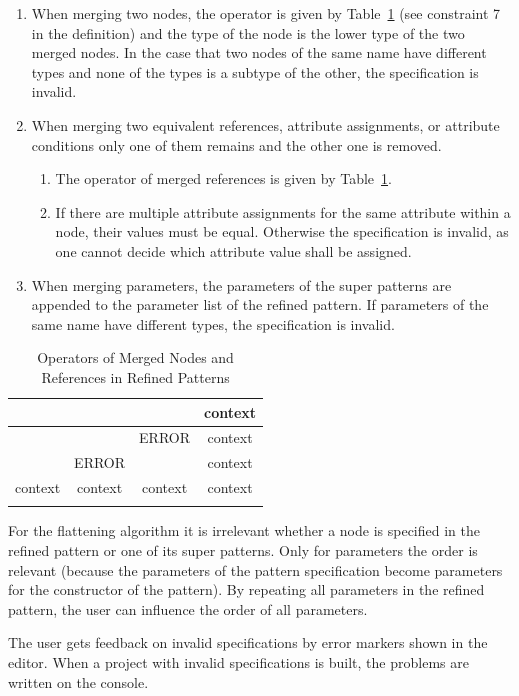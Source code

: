 \begin{enumerate}
	\item When merging two nodes, the operator is given by Table~\ref{table:merging-operators} (see constraint 7 in the definition) and the type of the node is the lower type of the two merged nodes.
		In the case that two nodes of the same name have different types and none of the types is a subtype of the other, the specification is invalid.
	\item When merging two equivalent references, attribute assignments, or attribute conditions only one of them remains and the other one is removed.
		\begin{enumerate}
			\item The operator of merged references is given by Table~\ref{table:merging-operators}.
			\item If there are multiple attribute assignments for the same attribute within a node, their values must be equal.
				Otherwise the specification is invalid, as one cannot decide which attribute value shall be assigned.
		\end{enumerate}
	\item When merging parameters, the parameters of the super patterns are appended to the parameter list of the refined pattern.
		If parameters of the same name have different types, the specification is invalid.
\end{enumerate}

\begin{longtable}[h!]{c|ccc}
	\toprule
				& \create	& \delete 	& context \\
	\midrule
	\create		& \create	& ERROR		& context \\
	\delete		& ERROR		& \delete	& context \\
	context		& context	& context	& context \\
	\bottomrule
	\caption{Operators of Merged Nodes and References in Refined Patterns}
	\label{table:merging-operators}
\end{longtable}

\noindent
For the flattening algorithm it is irrelevant whether a node is specified in the refined pattern or one of its super patterns.
Only for parameters the order is relevant (because the parameters of the pattern specification become parameters for the constructor of the pattern).
By repeating all parameters in the refined pattern, the user can influence the order of all parameters.

The user gets feedback on invalid specifications by error markers shown in the editor.
When a project with invalid specifications is built, the problems are written on the console.


